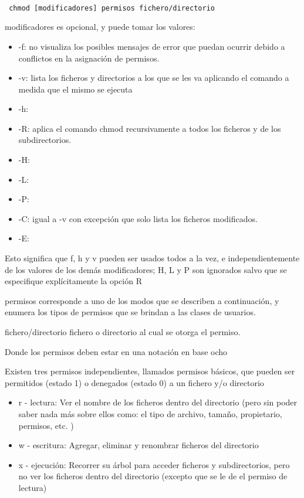 \documentclass{article}
\begin{document}
\begin{verbatim}

 chmod [modificadores] permisos fichero/directorio

\end{verbatim}

modificadores es opcional, y puede tomar los valores:

\begin{itemize}
\item-f: no visualiza los posibles mensajes de error que puedan ocurrir debido a conflictos en la asignación de permisos.
\item-v: lista los ficheros y directorios a los que se les va aplicando el comando a medida que el mismo se ejecuta
\item-h:
\item-R: aplica el comando chmod recursivamente a todos los ficheros y de los subdirectorios.
\item-H:
\item-L:
\item-P:
\item-C: igual a -v con excepción que solo lista los ficheros modificados.
\item-E:
\end{itemize}

Esto significa que f, h y v pueden ser usados todos a la vez, e independientemente de los valores de los demás modificadores; H, L y P son ignorados salvo que se especifique explícitamente la opción R

permisos corresponde a uno de los modos que se describen a continuación, y enumera los tipos de permisos que se brindan a las clases de usuarios.

fichero/directorio fichero o directorio al cual se otorga el permiso.


Donde los permisos deben estar en una notación en base ocho

Existen tres permisos independientes, llamados permisos básicos, que pueden ser permitidos (estado 1) o denegados (estado 0) a un fichero y/o directorio

\begin{itemize}
\item r - lectura: Ver el nombre de los ficheros dentro del directorio (pero sin poder saber nada más sobre ellos como: el tipo de archivo, tamaño, propietario, permisos, etc. )
\item w - escritura: Agregar, eliminar y renombrar ficheros del directorio
\item x - ejecución: Recorrer su árbol para acceder ficheros y subdirectorios, pero no ver los ficheros dentro del directorio (excepto que se le de el permiso de lectura)
\end{itemize}
\end{document}

